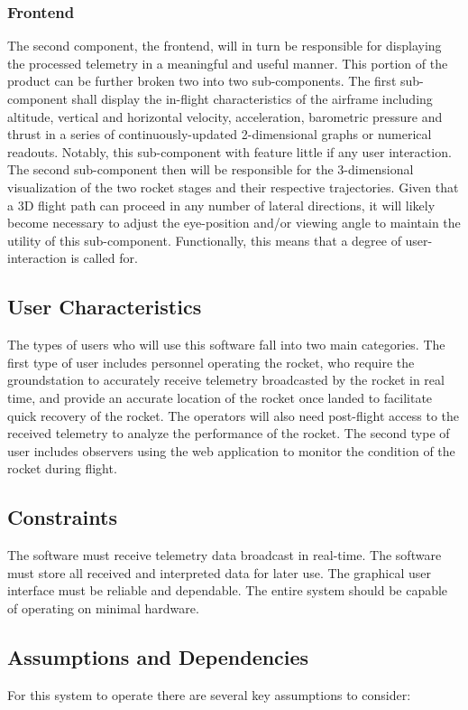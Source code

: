 \documentclass[onecolumn, draftclsnofoot,10pt, compsoc]{IEEEtran}
\begin{document}
			\subsubsection{Frontend}
			The second component, the frontend, will in turn be responsible for displaying the processed telemetry in a meaningful and useful manner.
			This portion of the product can be further broken two into two sub-components.
			The first sub-component shall display the in-flight characteristics of the airframe including altitude, vertical and horizontal velocity, acceleration, barometric pressure and thrust in a series of continuously-updated 2-dimensional graphs or numerical readouts. 
			Notably, this sub-component with feature little if any user interaction. 
			The second sub-component then will be responsible for the 3-dimensional visualization of the two rocket stages and their respective trajectories. 
			Given that a 3D flight path can proceed in any number of lateral directions, it will likely become necessary to adjust the eye-position and/or viewing angle to maintain the utility of this sub-component.
			Functionally, this means that a degree of user-interaction is called for.
			
		\subsection{User Characteristics}
			The types of users who will use this software fall into two main categories. 
			The first type of user includes personnel operating the rocket, who require the groundstation to accurately receive telemetry broadcasted by the rocket in real time, and provide an accurate location of the rocket once landed to facilitate quick recovery of the rocket.
			The operators will also need post-flight access to the received telemetry to analyze the performance of the rocket.
			The second type of user includes observers using the web application to monitor the condition of the rocket during flight.

		\subsection{Constraints}
			The software must receive telemetry data broadcast in real-time.
			The software must store all received and interpreted data for later use.
			The graphical user interface must be reliable and dependable.
			The entire system should be capable of operating on minimal hardware.

		\subsection{Assumptions and Dependencies}
			For this system to operate there are several key assumptions to consider:
			
\end{document}
